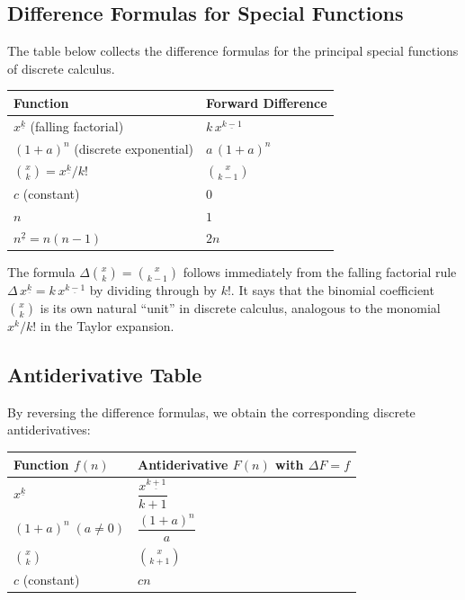 
\subsection*{Difference Formulas for Special Functions}

The table below collects the difference formulas for the principal
special functions of discrete calculus.

\begin{remark*}
\renewcommand{\arraystretch}{1.7}
\begin{tabular}{@{}l l@{}}
\textbf{Function} & \textbf{Forward Difference} \\
\hline
$x^{\underline{k}}$ (falling factorial) & $k\,x^{\underline{k-1}}$ \\
$(1+a)^n$ (discrete exponential) & $a\,(1+a)^n$ \\
$\binom{x}{k} = x^{\underline{k}}/k!$ & $\binom{x}{k-1}$ \\
$c$ (constant) & $0$ \\
$n$ & $1$ \\
$n^{\underline{2}} = n(n-1)$ & $2n$ \\
\end{tabular}
\end{remark*}

\begin{remark*}
The formula \(\Delta\binom{x}{k} = \binom{x}{k-1}\) follows immediately
from the falling factorial rule \(\Delta\,x^{\underline{k}} = k\,x^{\underline{k-1}}\)
by dividing through by \(k!\). It says that the binomial coefficient
\(\binom{x}{k}\) is its own natural ``unit'' in discrete calculus, analogous
to the monomial \(x^k/k!\) in the Taylor expansion.
\end{remark*}

\subsection*{Antiderivative Table}

By reversing the difference formulas, we obtain the corresponding
discrete antiderivatives:

\begin{remark*}
\renewcommand{\arraystretch}{1.7}
\begin{tabular}{@{}l l@{}}
\textbf{Function \(f(n)\)} & \textbf{Antiderivative \(F(n)\) with \(\Delta F = f\)} \\
\hline
$x^{\underline{k}}$ & $\dfrac{x^{\underline{k+1}}}{k+1}$ \\[6pt]
$(1+a)^n\;(a\ne 0)$ & $\dfrac{(1+a)^n}{a}$ \\[6pt]
$\binom{x}{k}$ & $\binom{x}{k+1}$ \\[6pt]
$c$ (constant) & $cn$ \\
\end{tabular}
\end{remark*}

